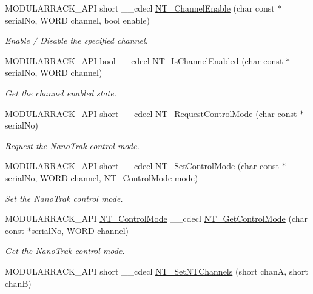 \begin{DoxyCompactItemize}
M\+O\+D\+U\+L\+A\+R\+R\+A\+C\+K\+\_\+\+A\+PI short \+\_\+\+\_\+cdecl \hyperlink{group___modular_nano_trak_ga5163814ab1ffbb75190be09e663893bb}{N\+T\+\_\+\+Channel\+Enable} (char const $\ast$serial\+No, W\+O\+RD channel, bool enable)
\begin{DoxyCompactList}\small\item\em Enable / Disable the specified channel. \end{DoxyCompactList}\item 
M\+O\+D\+U\+L\+A\+R\+R\+A\+C\+K\+\_\+\+A\+PI bool \+\_\+\+\_\+cdecl \hyperlink{group___modular_nano_trak_gacccfa05f5174d522f9bcaa43304b7290}{N\+T\+\_\+\+Is\+Channel\+Enabled} (char const $\ast$serial\+No, W\+O\+RD channel)
\begin{DoxyCompactList}\small\item\em Get the channel enabled state. \end{DoxyCompactList}\item 
M\+O\+D\+U\+L\+A\+R\+R\+A\+C\+K\+\_\+\+A\+PI short \+\_\+\+\_\+cdecl \hyperlink{group___modular_nano_trak_gaef77e035541157046e0cfbbe0554662d}{N\+T\+\_\+\+Request\+Control\+Mode} (char const $\ast$serial\+No)
\begin{DoxyCompactList}\small\item\em Request the Nano\+Trak control mode. \end{DoxyCompactList}\item 
M\+O\+D\+U\+L\+A\+R\+R\+A\+C\+K\+\_\+\+A\+PI short \+\_\+\+\_\+cdecl \hyperlink{group___modular_nano_trak_gab4485d39ef503af38b18d43440f64b1f}{N\+T\+\_\+\+Set\+Control\+Mode} (char const $\ast$serial\+No, W\+O\+RD channel, \hyperlink{group___common_gafe8ff923e94424207dcf44a4e429e26d}{N\+T\+\_\+\+Control\+Mode} mode)
\begin{DoxyCompactList}\small\item\em Set the Nano\+Trak control mode. \end{DoxyCompactList}\item 
M\+O\+D\+U\+L\+A\+R\+R\+A\+C\+K\+\_\+\+A\+PI \hyperlink{group___common_gafe8ff923e94424207dcf44a4e429e26d}{N\+T\+\_\+\+Control\+Mode} \+\_\+\+\_\+cdecl \hyperlink{group___modular_nano_trak_ga977d7d35908014426684eaad801deb1d}{N\+T\+\_\+\+Get\+Control\+Mode} (char const $\ast$serial\+No, W\+O\+RD channel)
\begin{DoxyCompactList}\small\item\em Get the Nano\+Trak control mode. \end{DoxyCompactList}\item 
M\+O\+D\+U\+L\+A\+R\+R\+A\+C\+K\+\_\+\+A\+PI short \+\_\+\+\_\+cdecl \hyperlink{group___modular_nano_trak_ga2e9880d680ad2af3468be7baccaf3404}{N\+T\+\_\+\+Set\+N\+T\+Channels} (short chanA, short chanB)

\end{DoxyCompactItemize}
